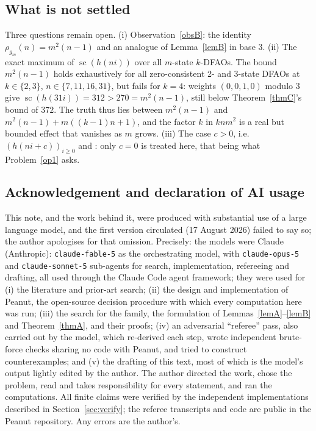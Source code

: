 \documentclass[10pt,reqno]{amsart}
\theoremstyle{plain}
\theoremstyle{definition}
\theoremstyle{remark}
\numberwithin{theorem}{section}
\DeclareMathOperator{\sco}{sc}
\begin{document}
\subsection*{What is not settled}
Three questions remain open. (i) Observation~\ref{obsB}: the identity
$\rho_{g_m}(n) = m^2(n-1)$ and an analogue of Lemma~\ref{lemB} in base 3. (ii) The exact
maximum of $\sco(h(ni))$ over all $m$-state $k$-DFAOs. The bound $m^2(n-1)$ holds
exhaustively for all zero-consistent 2- and 3-state DFAOs at $k \in \{2,3\}$,
$n \in \{7,11,16,31\}$, but fails for $k = 4$: weights $(0,0,1,0)$ modulo $3$ give
$\sco(h(31i)) = 312 > 270 = m^2(n-1)$, still below Theorem~\ref{thmC}'s bound of $372$. The
truth thus lies between $m^2(n-1)$ and $m^2(n-1) + m((k-1)n+1)$, and the factor $k$ in
$knm^2$ is a real but bounded effect that vanishes as $m$ grows. (iii) The case $c > 0$,
i.e.\ $(h(ni+c))_{i\ge0}$ and \cite[Cor.~10(b)]{MRS}: only $c = 0$ is treated here, that
being what Problem~\ref{op1} asks.

\subsection*{Acknowledgement and declaration of AI usage}
This note, and the work behind it, were produced with substantial use of a large language
model, and the first version circulated (17 August 2026) failed to say so; the author
apologises for that omission. Precisely: the models were Claude (Anthropic): \texttt{claude-fable-5} as the orchestrating model, with \texttt{claude-opus-5} and \texttt{claude-sonnet-5} sub-agents for search, implementation, refereeing and drafting, all used through the Claude Code agent framework; they were used for
(i) the literature and prior-art search; (ii) the design and implementation of Peanut, the
open-source decision procedure with which every computation here was run; (iii) the search
for the family, the formulation of Lemmas~\ref{lemA}--\ref{lemB} and Theorem~\ref{thmA}, and
their proofs; (iv) an adversarial ``referee'' pass, also carried out by the model, which
re-derived each step, wrote independent brute-force checks sharing no code with Peanut, and
tried to construct counterexamples; and (v) the drafting of this text, most of which is the
model's output lightly edited by the author. The author directed the work, chose the
problem, read and takes responsibility for every statement, and ran the computations. All
finite claims were verified by the independent implementations described in
Section~\ref{sec:verify}; the referee transcripts and code are public in the Peanut
repository. Any errors are the author's.
\end{document}
